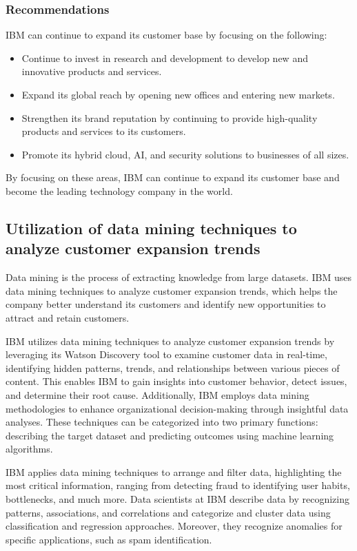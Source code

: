 \subsubsection{Recommendations}

IBM can continue to expand its customer base by focusing on the following:

\begin{itemize}
\item Continue to invest in research and development to develop new and innovative products and services.
\item Expand its global reach by opening new offices and entering new markets.
\item Strengthen its brand reputation by continuing to provide high-quality products and services to its customers.
\item Promote its hybrid cloud, AI, and security solutions to businesses of all sizes.
\end{itemize}

By focusing on these areas, IBM can continue to expand its customer base and become the leading technology company in the world.

\subsection{Utilization of data mining techniques to analyze customer expansion trends}

Data mining is the process of extracting knowledge from large datasets. IBM uses data mining techniques to analyze customer expansion trends, which helps the company better understand its customers and identify new opportunities to attract and retain customers.


IBM utilizes data mining techniques to analyze customer expansion trends by leveraging its Watson Discovery tool to examine customer data in real-time, identifying hidden patterns, trends, and relationships between various pieces of content. This enables IBM to gain insights into customer behavior, detect issues, and determine their root cause. Additionally, IBM employs data mining methodologies to enhance organizational decision-making through insightful data analyses. These techniques can be categorized into two primary functions: describing the target dataset and predicting outcomes using machine learning algorithms.

IBM applies data mining techniques to arrange and filter data, highlighting the most critical information, ranging from detecting fraud to identifying user habits, bottlenecks, and much more. Data scientists at IBM describe data by recognizing patterns, associations, and correlations and categorize and cluster data using classification and regression approaches. Moreover, they recognize anomalies for specific applications, such as spam identification.

